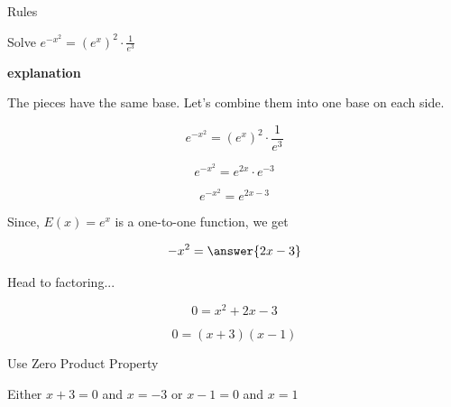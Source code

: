 \documentclass{ximera}
\begin{document}
\begin{example} Rules



Solve $e^{- x^2} = \left(e^x\right)^2 \cdot \frac{1}{e^3}$


\textbf{\textcolor{red!75!green}{explanation}} 

The pieces have the same base.  Let's combine them into one base on each side.



\[  e^{- x^2} = \left(e^x\right)^2 \cdot \frac{1}{e^3}     \]

\[  e^{- x^2}  = e^{2x} \cdot e^{-3} \]

\[  e^{- x^2}  = e^{2x-3}  \]



Since, $E(x) = e^x$ is a one-to-one function, we get


\[  -x^2 = \answer{2x - 3}  \]


Head to factoring...


\[  0 = x^2 + 2x - 3  \]


\[  0 =(x+3)(x-1) \]


Use Zero Product Property



Either  $x+3 = 0$ and $x = -3$  or $x-1=0$ and $x = 1$


\end{example}
\end{document}
